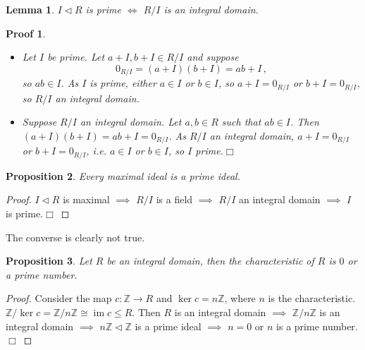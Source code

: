 \documentclass{article}
\theoremstyle{plain}\theoremheaderfont{\normalfont\itshape}\theorembodyfont{\rmfamily}\theoremseparator{.}\newtheorem*{rem}{Remark}\newtheorem*{ex}{Example}\newtheorem*{proof}{Proof}\newtheorem*{altp}{Alternative proof}\newtheorem*{nonex}{Non-Example}
\theoremstyle{plain}\theoremheaderfont{\normalfont\bfseries}\theorembodyfont{\rmfamily}\theoremseparator{.}\newtheorem{thm}{Theorem}[section]\newtheorem{lem}[thm]{Lemma}\newtheorem{prop}[thm]{Proposition}\newtheorem*{cor}{Corollary}\newtheorem{defn}[thm]{Definition}\newtheorem{clm}[thm]{Claim}\newtheorem{clminproof}{Claim}\newtheorem*{notn}{Notation}\newtheorem*{exer}{Exercise}\newtheorem*{lemnn}{Lemma}
\theoremstyle{break}\theoremheaderfont{\normalfont\itshape}\theorembodyfont{\rmfamily}\theoremseparator{.\medskip}\newtheorem*{proofskip}{Proof}\newtheorem*{exs}{Examples}\newtheorem*{rems}{Remarks}\newtheorem*{obs}{Observations}
\theoremstyle{break}\theoremheaderfont{\normalfont\bfseries}\theorembodyfont{\rmfamily}\theoremseparator{.\medskip}\newtheorem{lemskip}[thm]{Lemma}\newtheorem{defnskip}[thm]{Definition}\newtheorem{propskip}[thm]{Proposition}\newtheorem{thmskip}[thm]{Theorem}
\numberwithin{equation}{section}
\newcommand{\qed}{\hfill\ensuremath{\Box}}
\DeclareMathOperator*{\im}{im}
\newcommand{\ZZ}{\mathbb{Z}}
\begin{document}
    \begin{lem}
        \(I\lhd R\) is prime \(\iff\) \(R/I\) is an integral domain.
    \end{lem}
    \begin{proofskip}
        \begin{itemize}[topsep=0pt]
            \item[(\(\Rightarrow\))] Let \(I\) be prime. Let \(a+I,b+I\in R/I\) and suppose
            \[0_{R/I}=(a+I)(b+I)=ab+I\,,\]
            so \(ab\in I\). As \(I\) is prime, either \(a\in I\) or \(b\in I\), so \(a+I=0_{R/I}\) or \(b+I=0_{R/I}\), so \(R/I\) an integral domain.
            \item[(\(\Leftarrow\))] Suppose \(R/I\) an integral domain. Let \(a,b\in R\) such that \(ab\in I\). Then \((a+I)(b+I)=ab+I=0_{R/I}\). As \(R/I\) an integral domain, \(a+I=0_{R/I}\) or \(b+I=0_{R/I}\), i.e. \(a\in I\) or \(b\in I\), so \(I\) prime.\qed 
        \end{itemize} 
    \end{proofskip}
    \begin{prop}
        Every maximal ideal is a prime ideal.
    \end{prop}
    \begin{proof}
        \(I\lhd R\) is maximal \(\implies\) \(R/I\) is a field \(\implies\) \(R/I\) an integral domain \(\implies\) \(I\) is prime.\qed
    \end{proof}
    The converse is clearly not true.
    \begin{prop}
        Let \(R\) be an integral domain, then the characteristic of \(R\) is \(0\) or a prime number.
    \end{prop}
    \begin{proof}
        Consider the map \(c:\ZZ\to R\) and \(\ker c=n\ZZ\), where \(n\) is the characteristic. \(\ZZ/\ker c=\ZZ/n\ZZ\cong\im c\le R\). Then \(R\) is an integral domain \(\implies\) \(\ZZ/n\ZZ\) is an integral domain \(\implies\) \(n\ZZ\lhd \ZZ\) is a prime ideal \(\implies\) \(n=0\) or \(n\) is a prime number.\qed
    \end{proof}
\end{document}
